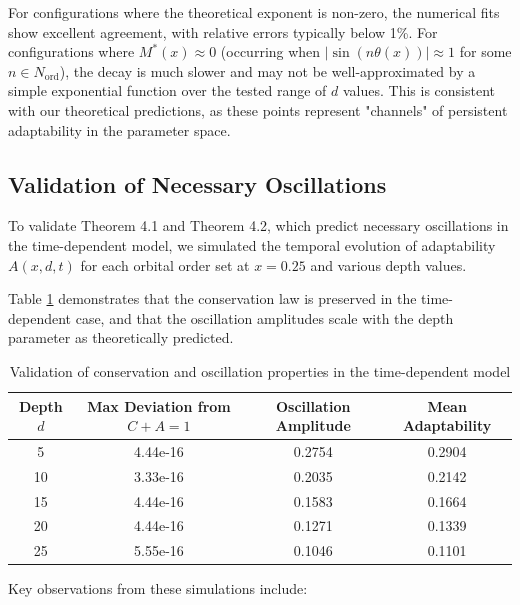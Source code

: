 \documentclass[11pt,a4paper]{article}
\begin{document}
For configurations where the theoretical exponent is non-zero, the numerical fits show excellent agreement, with relative errors typically below 1\%. For configurations where $M^*(x) \approx 0$ (occurring when $|\sin(n\theta(x))| \approx 1$ for some $n \in N_{\text{ord}}$), the decay is much slower and may not be well-approximated by a simple exponential function over the tested range of $d$ values. This is consistent with our theoretical predictions, as these points represent "channels" of persistent adaptability in the parameter space.

\subsection{Validation of Necessary Oscillations}

To validate Theorem 4.1 and Theorem 4.2, which predict necessary oscillations in the time-dependent model, we simulated the temporal evolution of adaptability $A(x,d,t)$ for each orbital order set at $x = 0.25$ and various depth values.

Table \ref{tab:oscillation_validation} demonstrates that the conservation law is preserved in the time-dependent case, and that the oscillation amplitudes scale with the depth parameter as theoretically predicted.

\begin{table}[H]
    \centering
    \begin{tabular}{cccc}
    \toprule
    Depth $d$ & Max Deviation from $C+A=1$ & Oscillation Amplitude & Mean Adaptability \\
    \midrule
    5 & 4.44e-16 & 0.2754 & 0.2904 \\
    10 & 3.33e-16 & 0.2035 & 0.2142 \\
    15 & 4.44e-16 & 0.1583 & 0.1664 \\
    20 & 4.44e-16 & 0.1271 & 0.1339 \\
    25 & 5.55e-16 & 0.1046 & 0.1101 \\
    \bottomrule
    \end{tabular}
    \caption{Validation of conservation and oscillation properties in the time-dependent model}
    \label{tab:oscillation_validation}
\end{table}

Key observations from these simulations include:
\end{document}
